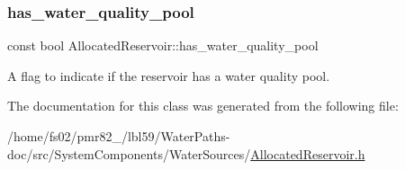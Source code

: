 \subsubsection{\texorpdfstring{has\+\_\+water\+\_\+quality\+\_\+pool}{has\_water\_quality\_pool}}
{\footnotesize\ttfamily const bool Allocated\+Reservoir\+::has\+\_\+water\+\_\+quality\+\_\+pool\hspace{0.3cm}{\ttfamily [protected]}}



A flag to indicate if the reservoir has a water quality pool. 



The documentation for this class was generated from the following file\+:\begin{DoxyCompactItemize}
\item 
/home/fs02/pmr82\+\_/lbl59/\+Water\+Paths-\/doc/src/\+System\+Components/\+Water\+Sources/\mbox{\hyperlink{AllocatedReservoir_8h}{Allocated\+Reservoir.\+h}}\end{DoxyCompactItemize}
